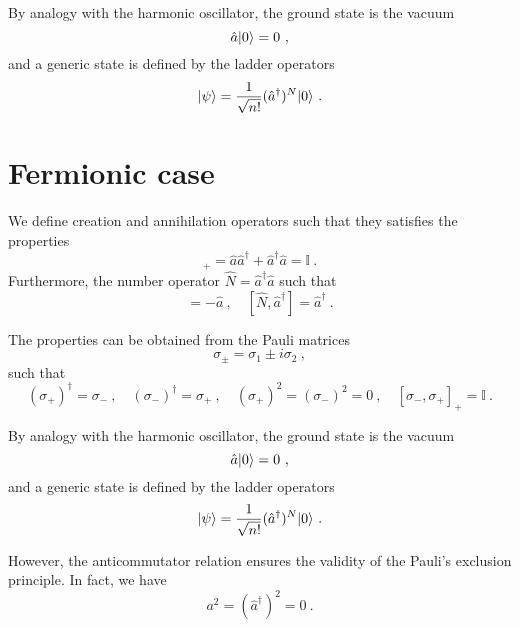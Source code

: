     By analogy with the harmonic oscillator, the ground state is the vacuum 
    \begin{equation*}
        \hat a \vert0\rangle = 0 ~,
    \end{equation*}
    and a generic state is defined by the ladder operators
    \begin{equation*}
        \vert\psi\rangle = \frac{1}{\sqrt{n!}} (\hat a^\dagger)^N \vert0\rangle ~.
    \end{equation*}

\section{Fermionic case}

    We define creation and annihilation operators such that they satisfies the properties 
    \begin{equation*}
        [\hat a, \hat a^\dagger]_+ = \hat a \hat a^\dagger + \hat a^\dagger \hat a = \mathbb I~.
    \end{equation*}
    Furthermore, the number operator $\hat N = \hat a^\dagger \hat a$ such that 
    \begin{equation*}
        [\hat N, \hat a] = - \hat a~, \quad [\hat N, \hat a^\dagger] = \hat a^\dagger ~.
    \end{equation*} 

    The properties can be obtained from the Pauli matrices 
    \begin{equation*}
        \sigma_\pm = \sigma_1 \pm i \sigma_2 ~,
    \end{equation*}
    such that 
    \begin{equation*}
        (\sigma_+)^\dagger = \sigma_- ~, \quad (\sigma_-)^\dagger = \sigma_+ ~, \quad (\sigma_+)^2 = (\sigma_-)^2 = 0 ~, \quad [\sigma_-, \sigma_+]_+ = \mathbb I ~.
    \end{equation*}

    By analogy with the harmonic oscillator, the ground state is the vacuum 
    \begin{equation*}
        \hat a \vert0\rangle = 0 ~,
    \end{equation*}
    and a generic state is defined by the ladder operators
    \begin{equation*}
        \vert\psi\rangle = \frac{1}{\sqrt{n!}} (\hat a^\dagger)^N \vert0\rangle ~.
    \end{equation*}

    However, the anticommutator relation ensures the validity of the Pauli's exclusion principle. In fact, we have 
    \begin{equation*}
        a^2 = (\hat a^\dagger)^2 = 0 ~.
    \end{equation*}

